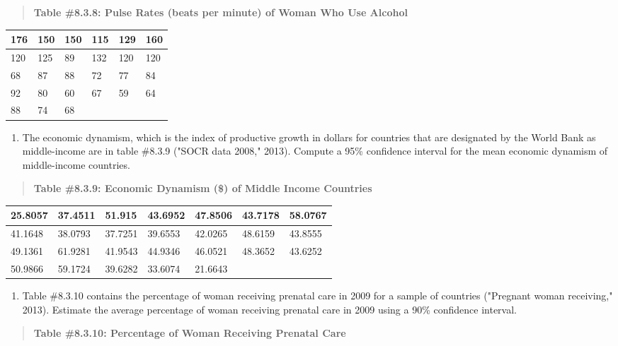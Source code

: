 \documentclass[]{book}
\providecommand{\tightlist}{%
  \setlength{\itemsep}{0pt}\setlength{\parskip}{0pt}}
\begin{document}
\begin{quote}
\textbf{Table \#8.3.8: Pulse Rates (beats per minute) of Woman Who Use
Alcohol}
\end{quote}

\begin{longtable}[]{@{}llllll@{}}
\toprule
176 & 150 & 150 & 115 & 129 & 160\tabularnewline
\midrule
\endhead
120 & 125 & 89 & 132 & 120 & 120\tabularnewline
68 & 87 & 88 & 72 & 77 & 84\tabularnewline
92 & 80 & 60 & 67 & 59 & 64\tabularnewline
88 & 74 & 68 & & &\tabularnewline
\bottomrule
\end{longtable}

\begin{enumerate}
\def\labelenumi{\arabic{enumi}.}
\setcounter{enumi}{5}
\tightlist
\item
  The economic dynamism, which is the index of productive growth in dollars for countries that are designated by the World Bank as middle-income are in table \#8.3.9 ("SOCR data 2008," 2013). Compute a 95\% confidence interval for the mean economic dynamism of middle-income countries.
\end{enumerate}

\begin{quote}
\textbf{Table \#8.3.9: Economic Dynamism (\$) of Middle Income Countries}
\end{quote}

\begin{longtable}[]{@{}lllllll@{}}
\toprule
25.8057 & 37.4511 & 51.915 & 43.6952 & 47.8506 & 43.7178 & 58.0767\tabularnewline
\midrule
\endhead
41.1648 & 38.0793 & 37.7251 & 39.6553 & 42.0265 & 48.6159 & 43.8555\tabularnewline
49.1361 & 61.9281 & 41.9543 & 44.9346 & 46.0521 & 48.3652 & 43.6252\tabularnewline
50.9866 & 59.1724 & 39.6282 & 33.6074 & 21.6643 & &\tabularnewline
\bottomrule
\end{longtable}

\begin{enumerate}
\def\labelenumi{\arabic{enumi}.}
\setcounter{enumi}{6}
\tightlist
\item
  Table \#8.3.10 contains the percentage of woman receiving prenatal care in 2009 for a sample of countries ("Pregnant woman receiving," 2013). Estimate the average percentage of woman receiving prenatal care in 2009 using a 90\% confidence interval.
\end{enumerate}

\begin{quote}
\textbf{Table \#8.3.10: Percentage of Woman Receiving Prenatal Care}
\end{quote}
\end{document}
